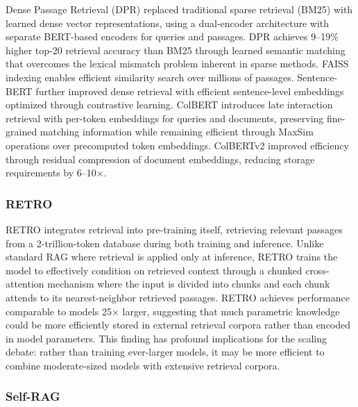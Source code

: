\documentclass[11pt,letterpaper]{article}
\begin{document}
Dense Passage Retrieval (DPR) \cite{karpukhin2020dense} replaced traditional sparse retrieval (BM25) with learned dense vector representations, using a dual-encoder architecture with separate BERT-based encoders for queries and passages. DPR achieves 9--19\% higher top-20 retrieval accuracy than BM25 through learned semantic matching that overcomes the lexical mismatch problem inherent in sparse methods. FAISS indexing enables efficient similarity search over millions of passages. Sentence-BERT \cite{reimers2019sentencebert} further improved dense retrieval with efficient sentence-level embeddings optimized through contrastive learning. ColBERT \cite{khattab2020colbert} introduces late interaction retrieval with per-token embeddings for queries and documents, preserving fine-grained matching information while remaining efficient through MaxSim operations over precomputed token embeddings. ColBERTv2 \cite{santhanam2022colbertv2} improved efficiency through residual compression of document embeddings, reducing storage requirements by 6--10$\times$.

\subsubsection{RETRO}

RETRO \cite{borgeaud2022improving} integrates retrieval into pre-training itself, retrieving relevant passages from a 2-trillion-token database during both training and inference. Unlike standard RAG where retrieval is applied only at inference, RETRO trains the model to effectively condition on retrieved context through a chunked cross-attention mechanism where the input is divided into chunks and each chunk attends to its nearest-neighbor retrieved passages. RETRO achieves performance comparable to models 25$\times$ larger, suggesting that much parametric knowledge could be more efficiently stored in external retrieval corpora rather than encoded in model parameters. This finding has profound implications for the scaling debate: rather than training ever-larger models, it may be more efficient to combine moderate-sized models with extensive retrieval corpora.

\subsubsection{Self-RAG}
\end{document}
